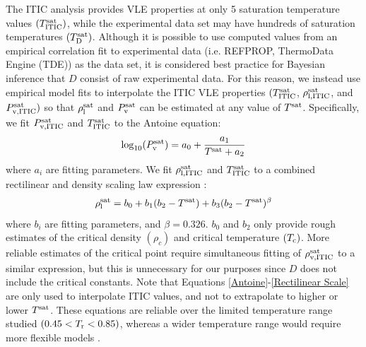 \documentclass[preprint,letterpaper,floatfix,citeautoscript,aip,jcp]{revtex4-1}
\begin{document}
The ITIC analysis provides VLE properties at only 5 saturation temperature values $(T^{\rm sat}_{\rm ITIC})$, while the experimental data set may have hundreds of saturation temperatures $(T^{\rm sat}_{\rm D})$. Although it is possible to use computed values from an empirical correlation fit to experimental data (i.e. REFPROP, ThermoData Engine (TDE)) as the data set, it is considered best practice for Bayesian inference that $D$ consist of raw experimental data.
For this reason, we instead use empirical model fits to interpolate the ITIC VLE properties $(T^{\rm sat}_{\rm ITIC}$, $\rho_{\rm l, ITIC}^{\rm sat}$, and $P_{\rm v, ITIC}^{\rm sat})$ so that $\rho_{\rm l}^{\rm sat}$ and $P_{\rm v}^{\rm sat}$ can be estimated at any value of $T^{\rm sat}$. Specifically, we fit $P_{\rm v, ITIC}^{\rm sat}$ and $T^{\rm sat}_{\rm ITIC}$ to the Antoine equation:
\begin{equation} \label{Antoine}
\log_{\rm 10}(P_{\rm v}^{\rm sat}) = a_0 + \frac{a_1}{T^{\rm sat} + a_2}
\end{equation}
where $a_i$ are fitting parameters.
We fit $\rho_{\rm l, ITIC}^{\rm sat}$ and $T^{\rm sat}_{\rm ITIC}$ to a combined rectilinear and density scaling law expression \cite{Mess4}:
\begin{equation} \label{Rectilinear Scale}
\rho_{\rm l}^{\rm sat} = b_0 + b_1 (b_2 - T^{\rm sat}) + b_3 (b_2 - T^{\rm sat}) ^ {\beta}
\end{equation}
where $b_i$ are fitting parameters, and $\beta = 0.326$. $b_0$ and $b_2$ only provide rough estimates of the critical density $(\rho_c)$ and critical temperature $(T_{\rm c})$. More reliable estimates of the critical point require simultaneous fitting of $\rho_{\rm v, ITIC}^{\rm sat}$ to a similar expression, but this is unnecessary for our purposes since $D$ does not include the critical constants. Note that Equations \ref{Antoine}-\ref{Rectilinear Scale} are only used to interpolate ITIC values, and not to extrapolate to higher or lower $T^{\rm sat}$. These equations are reliable over the limited temperature range studied $(0.45 < T_{\rm r} < 0.85)$, whereas a wider temperature range would require more flexible models \cite{Riedel,Funke}. 
\end{document}
